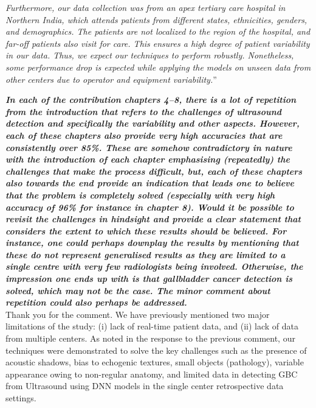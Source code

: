 \documentclass[11pt,times]{article}
\newcommand{\myfirstpara}[1]{\noindent \textbf{\textit{#1}}}
\newcommand{\mypara}[1]{\vspace{0.75em} \myfirstpara{#1}\\}
\begin{document}
{\textit{Furthermore, our data collection was from an apex tertiary care hospital in Northern India, which attends patients from different states, ethnicities, genders, and demographics. The patients are not localized to the region of the hospital, and far-off patients also visit for care. This ensures a high degree of patient variability in our data. Thus, we expect our techniques to perform robustly. Nonetheless, some performance drop is expected while applying the models on unseen data from other centers due to operator and equipment variability.}'' 

\mypara{In each of the contribution chapters 4--8, there is a lot of repetition from the introduction that refers to the challenges of ultrasound detection and specifically the variability and other aspects. However, each of these chapters also provide very high accuracies that are consistently over 85\%. These are somehow contradictory in nature with the introduction of each chapter emphasising (repeatedly) the challenges that make the process difficult, but, each of these chapters also towards the end provide an indication that leads one to believe that the problem is completely solved (especially with very high accuracy of 96\% for instance in chapter 8). Would it be possible to revisit the challenges in hindsight and provide a clear statement that considers the extent to which these results should be believed. For instance, one could perhaps downplay the results by mentioning that these do not represent generalised results as they are limited to a single centre with very few radiologists being involved. Otherwise, the impression one ends up with is that gallbladder cancer detection is solved, which may not be the case. The minor comment about repetition could also perhaps be addressed.}
%
Thank you for the comment. We have previously mentioned two major limitations of the study: (i) lack of real-time patient data, and (ii) lack of data from multiple centers. As noted in the response to the previous comment, our techniques were demonstrated to solve the key challenges such as the presence of acoustic shadows, bias to echogenic textures, small objects (pathology), variable appearance owing to non-regular anatomy, and limited data in detecting GBC from Ultrasound using DNN models in the single center retrospective data settings.


}
\end{document}
